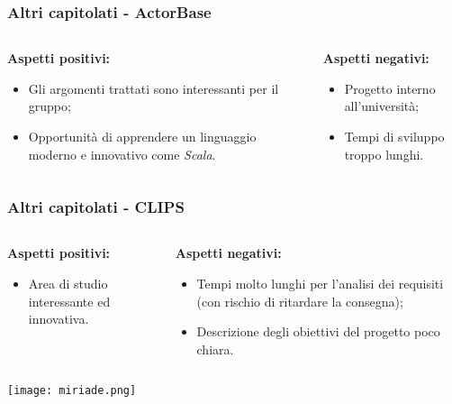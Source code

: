 \begin{frame}
  \frametitle{Altri capitolati - ActorBase}
  \begin{columns}
    \begin{column}{0.4\textwidth}
      \par{\textbf{Aspetti positivi:}}
      \begin{itemize}
      \item Gli argomenti trattati sono interessanti per il gruppo;
      \item Opportunità di apprendere un linguaggio moderno e innovativo come \textit{Scala}.
      \end{itemize}
    \end{column}
    \begin{column}{0.4\textwidth}
      \par{\textbf{Aspetti negativi:}}
      \begin{itemize}
      \item Progetto interno all'università;
      \item Tempi di sviluppo troppo lunghi.
      \end{itemize}
    \end{column}
  \end{columns}
\end{frame}

\begin{frame}
  \frametitle{Altri capitolati - CLIPS}
  \begin{columns}
    \begin{column}{0.4\textwidth}
      \par{\textbf{Aspetti positivi:}}
      \begin{itemize}
      \item Area di studio interessante ed innovativa.
      \end{itemize}
    \end{column}
    \begin{column}{0.4\textwidth}
      \par{\textbf{Aspetti negativi:}}
      \begin{itemize}
      \item Tempi molto lunghi per l'analisi dei requisiti (con rischio di ritardare la consegna);
      \item Descrizione degli obiettivi del progetto poco chiara.
      \end{itemize}
    \end{column}
  \end{columns}
  \texttt{[image: miriade.png]}
\end{frame}

